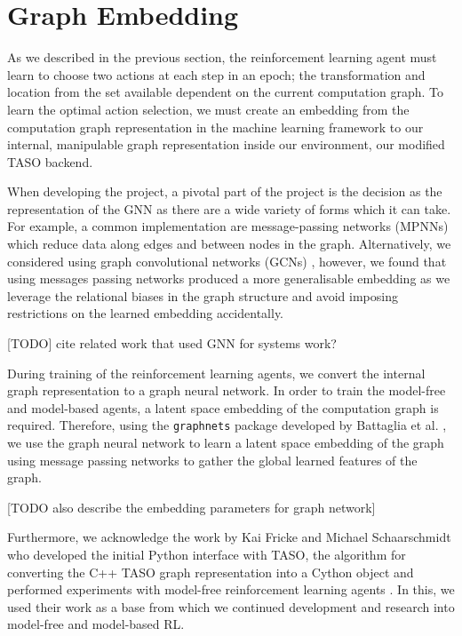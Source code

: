 \section{Graph Embedding}
\label{sec:design:subsec:embed}
As we described in the previous section, the reinforcement learning agent must learn to choose two actions at each step in an epoch; the transformation and location from the set available dependent on the current computation graph. To learn the optimal action selection, we must create an embedding from the computation graph representation in the machine learning framework to our internal, manipulable graph representation inside our environment, our modified TASO backend.

When developing the project, a pivotal part of the project is the decision as the representation of the GNN as there are a wide variety of forms which it can take. For example, a common implementation are message-passing networks (MPNNs) \cite{gilmer2017neural} which reduce data along edges and between nodes in the graph. Alternatively, we considered using graph convolutional networks (GCNs) \cite{kipf2016semi}, however, we found that using messages passing networks produced a more generalisable embedding as we leverage the relational biases in the graph structure and avoid imposing restrictions on the learned embedding accidentally.

[TODO] cite related work that used GNN for systems work?

During training of the reinforcement learning agents, we convert the internal graph representation to a graph neural network. In order to train the model-free and model-based agents, a latent space embedding of the computation graph is required. Therefore, using the \texttt{graph\textunderscore nets} package developed by Battaglia et al. \cite{battaglia2018relational}, we use the graph neural network to learn a latent space embedding of the graph using message passing networks to gather the global learned features of the graph.

[TODO also describe the embedding parameters for graph network]

Furthermore, we acknowledge the work by Kai Fricke and Michael Schaarschmidt who developed the initial Python interface with TASO, the algorithm for converting the C++ TASO graph representation into a Cython object and performed experiments with model-free reinforcement learning agents \cite{xflowrl2019}. In this, we used their work as a base from which we continued development and research into model-free and model-based RL.
